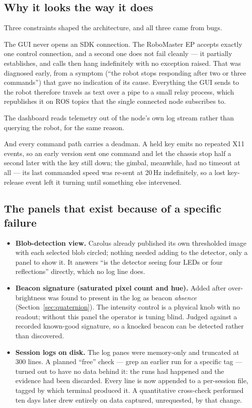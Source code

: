 \documentclass[11pt]{article}
\begin{document}
\subsection{Why it looks the way it does}

Three constraints shaped the architecture, and all three came from bugs.

The GUI never opens an SDK connection. The RoboMaster EP accepts exactly one
control connection, and a second one does not fail cleanly --- it partially
establishes, and calls then hang indefinitely with no exception raised. That
was diagnosed early, from a symptom (``the robot stops responding after two
or three commands'') that gave no indication of its cause. Everything the
GUI sends to the robot therefore travels as text over a pipe to a small
relay process, which republishes it on ROS topics that the single connected
node subscribes to.

The dashboard reads telemetry out of the node's own log stream rather than
querying the robot, for the same reason.

And every command path carries a deadman. A held key emits no repeated X11
events, so an early version sent one command and let the chassis stop
half a second later with the key still down; the gimbal, meanwhile, had no
timeout at all --- its last commanded speed was re-sent at 20\,Hz
indefinitely, so a lost key-release event left it turning until something
else intervened.

\subsection{The panels that exist because of a specific failure}

\begin{itemize}
  \item \textbf{Blob-detection view.} Carolus already published its own
  thresholded image with each selected blob circled; nothing needed adding
  to the detector, only a panel to show it. It answers ``is the detector
  seeing four LEDs or four reflections'' directly, which no log line does.

  \item \textbf{Beacon signature (saturated pixel count and hue).} Added
  after over-brightness was found to present in the log as beacon
  \emph{absence} (Section~\ref{sec:quaternion}). The intensity control is a
  physical knob with no readout; without this panel the operator is tuning
  blind. Judged against a recorded known-good signature, so a knocked
  beacon can be detected rather than discovered.

  \item \textbf{Session logs on disk.} The log panes were memory-only and
  truncated at 300 lines. A planned ``free'' check --- grep an earlier run
  for a specific tag --- turned out to have no data behind it: the runs had
  happened and the evidence had been discarded. Every line is now appended
  to a per-session file, tagged by which terminal produced it. A
  quantitative cross-check performed ten days later drew entirely on data
  captured, unrequested, by that change.
\end{itemize}
\end{document}
